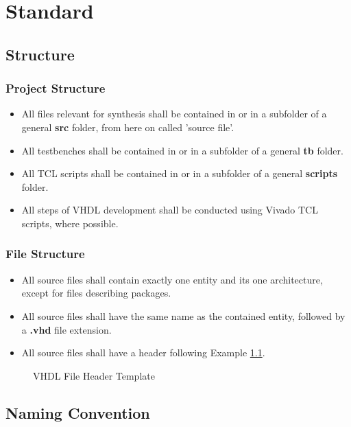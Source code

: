 \chapter{Standard}

\section{Structure}

\subsection{Project Structure}

\begin{itemize}[parsep=1pt]
	\item All files relevant for synthesis shall be contained in or in a subfolder of a general \textbf{src} folder, from here on called 'source file'.
	\item All testbenches shall be contained in or in a subfolder of a general \textbf{tb} folder.
	\item All TCL scripts shall be contained in or in a subfolder of a general \textbf{scripts} folder.
	\item All steps of VHDL development shall be conducted using Vivado TCL scripts, where possible.
\end{itemize}

\subsection{File Structure}
\label{sec:FileStructure}

\begin{itemize}[parsep=1pt]
	\item All source files shall contain exactly one entity and its one architecture, except for files describing packages.
	\item All source files shall have the same name as the contained entity, followed by a \textbf{.vhd} file extension.
	\item All source files shall have a header following Example \ref{fig:header}.
\end{itemize}
\begin{figure}[hbt]
	
	\caption{VHDL File Header Template}
	\label{fig:header}
\end{figure}

\section{Naming Convention}
\label{sec:Naming_Convention}

